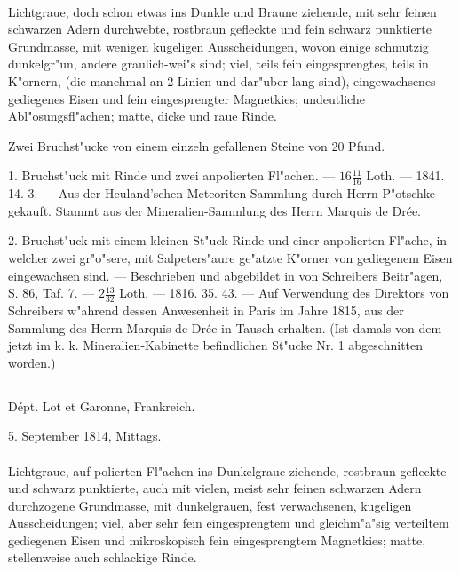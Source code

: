 \documentclass[a4paper, 11pt, oneside, polutonikogreek, german]{article}
\begin{document}
\paragraph{}
Lichtgraue, doch schon etwas ins Dunkle und Braune ziehende, mit sehr feinen schwarzen Adern durchwebte, rostbraun gefleckte und fein schwarz punktierte Grundmasse, mit wenigen kugeligen Ausscheidungen, wovon einige schmutzig dunkelgr"un, andere graulich-wei"s sind; viel, teils fein eingesprengtes, teils in K"ornern, (die manchmal an 2 Linien und dar"uber lang sind), eingewachsenes gediegenes Eisen und fein eingesprengter Magnetkies; undeutliche Abl"osungsfl"achen; matte, dicke und raue Rinde.

Zwei Bruchst"ucke von einem einzeln gefallenen Steine von 20 Pfund.

1. Bruchst"uck mit Rinde und zwei anpolierten Fl"achen. --- $\mathfrak{16\frac{11}{16}}$ Loth. --- 1841. 14. 3. --- Aus der Heuland'schen Meteoriten-Sammlung durch Herrn P"otschke gekauft. Stammt aus der Mineralien-Sammlung des Herrn Marquis de Drée.

2. Bruchst"uck mit einem kleinen St"uck Rinde und einer anpolierten Fl"ache, in welcher zwei gr"o"sere, mit Salpeters"aure ge"atzte K"orner von gediegenem Eisen eingewachsen sind. --- Beschrieben und abgebildet in von Schreibers Beitr"agen, S. 86, Taf. 7. --- $\mathfrak{2\frac{13}{32}}$ Loth. --- 1816. 35. 43. --- Auf Verwendung des Direktors von Schreibers w"ahrend dessen Anwesenheit in Paris im Jahre 1815, aus der Sammlung des Herrn Marquis de Drée in Tausch erhalten. (Ist damals von dem jetzt im k. k. Mineralien-Kabinette befindlichen St"ucke Nr. 1 abgeschnitten worden.)
\subsection{}
\begin{center}

Dépt. Lot et Garonne, Frankreich.

5. September 1814, Mittags.
\end{center}
\paragraph{}
Lichtgraue, auf polierten Fl"achen ins Dunkelgraue ziehende, rostbraun gefleckte und schwarz punktierte, auch mit vielen, meist sehr feinen schwarzen Adern durchzogene Grundmasse, mit dunkelgrauen, fest verwachsenen, kugeligen Ausscheidungen; viel, aber sehr fein eingesprengtem und gleichm"a"sig verteiltem gediegenen Eisen und mikroskopisch fein eingesprengtem Magnetkies; matte, stellenweise auch schlackige Rinde.
\end{document}
